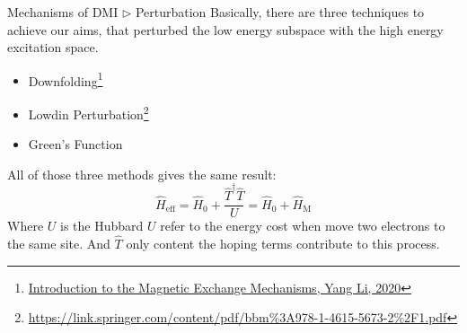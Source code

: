 \documentclass{beamer}
\begin{document}
  \begin{frame}{Mechanisms of DMI \(\rhd\) Perturbation}
    Basically, there are three techniques to achieve our aims, that perturbed the low energy subspace with the high energy excitation space.
    \begin{itemize}
      \item Downfolding\footnote{\tiny\href{https://github.com/kYangLi/PublicPresentation/blob/master/Intro2MEM/Intro._to_MEM.pdf}{Introduction to the Magnetic Exchange Mechanisms, Yang Li, 2020}}
      \item Lowdin Perturbation\footnote{\tiny\url{https://link.springer.com/content/pdf/bbm\%3A978-1-4615-5673-2\%2F1.pdf}}
      \item Green's Function
    \end{itemize}
    \begin{block}{}
      All of those three methods gives the same result:
      \begin{equation}
        \widehat{H}_{\text{eff}} = \widehat{H}_0 + \frac{\widehat{T}^\dagger\widehat{T}}{U} = \widehat{H}_0 + \widehat{H}_{\text{M}}
      \end{equation}
      Where \(U\) is the Hubbard \(U\) refer to the energy cost when move two electrons to the same site. And \(\widehat{T}\) only content the hoping terms contribute to this process.
    \end{block}
  \end{frame}
\end{document}

